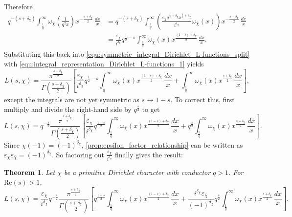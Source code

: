 \documentclass[12pt]{book}
\newtheorem{theorem}{Theorem}[section]
\theoremstyle{definition}\newframedtheorem{method}{Method}
\renewcommand{\d}{\delta}
\newcommand{\w}{\omega}
\newcommand{\G}{\Gamma}
\newcommand{\e}{\varepsilon}
\newcommand{\<}{\langle}
\renewcommand{\>}{\rangle}
\newcommand{\conj}{\overline}
\newcommand{\cchi}{\conj{\chi}}
\renewcommand{\Re}{\mathrm{Re}}
\begin{document}
      Therefore
      \begin{align*}
        q^{-(s+\d_{\chi})}\int_{\frac{1}{q}}^{\infty}\w_{\chi}\left(\frac{1}{q^{2}x}\right)x^{-\frac{s+\d_{\chi}}{2}}\,\frac{dx}{x} &= q^{-(s+\d_{\chi})}\int_{\frac{1}{q}}^{\infty}\left(\frac{\e_{\chi}q^{\frac{1}{2}+\d_{\chi}}x^{\frac{1}{2}+\d_{\chi}}}{i^{\d_{\chi}}}\w_{\cchi}(x)\right)x^{-\frac{s+\d_{\chi}}{2}}\,\frac{dx}{x} \\
        &= \frac{\e_{\chi}}{i^{\d_{\chi}}}q^{\frac{1}{2}-s}\int_{\frac{1}{q}}^{\infty}\w_{\cchi}(x)x^{\frac{(1-s)+\d_{\chi}}{2}}\,\frac{dx}{x}.
      \end{align*}
      Substituting this back into \cref{equ:symmetric_integral_Dirichlet_L-functions_split} with \cref{equ:integral_representation_Dirichlet_L-functions_1} yields
      \[
        L(s,\chi) = \frac{\pi^{\frac{s+\d_{\chi}}{2}}}{\G\left(\frac{s+\d_{\chi}}{2}\right)}\left[\frac{\e_{\chi}}{i^{\d_{\chi}}}q^{\frac{1}{2}-s}\int_{\frac{1}{q}}^{\infty}\w_{\cchi}(x)x^{\frac{(1-s)+\d_{\chi}}{2}}\,\frac{dx}{x}+\int_{\frac{1}{q}}^{\infty}\w_{\chi}(x)x^{\frac{s+\d_{\chi}}{2}}\,\frac{dx}{x}\right],
      \]
      except the integrals are not yet symmetric as $s \to 1-s$. To correct this, first multiply and divide the right-hand side by $q^{\frac{s}{2}}$ to get
      \[
        L(s,\chi) = q^{-\frac{s}{2}}\frac{\pi^{\frac{s+\d_{\chi}}{2}}}{\G\left(\frac{s+\d_{\chi}}{2}\right)}\left[\frac{\e_{\chi}}{i^{\d_{\chi}}}q^{\frac{1-s}{2}}\int_{\frac{1}{q}}^{\infty}\w_{\cchi}(x)x^{\frac{(1-s)+\d_{\chi}}{2}}\,\frac{dx}{x}+q^{\frac{s}{2}}\int_{\frac{1}{q}}^{\infty}\w_{\chi}(x)x^{\frac{s+\d_{\chi}}{2}}\,\frac{dx}{x}\right].
      \]
      Since $\chi(-1) = (-1)^{\d_{\chi}}$, \cref{prop:epsilon_factor_relationship} can be written as $\e_{\chi}\e_{\cchi} = (-1)^{\d_{\chi}}$. So factoring out $\frac{\e_{\chi}}{i^{\d_{\chi}}}$ finally gives the result:

      \begin{theorem}
        Let $\chi$ be a primitive Dirichlet character with conductor $q > 1$. For $\Re(s) > 1$,
        \[
          L(s,\chi) = \frac{\e_{\chi}}{i^{\d_{\chi}}}q^{-\frac{s}{2}}\frac{\pi^{\frac{s+\d_{\chi}}{2}}}{\G\left(\frac{s+\d_{\chi}}{2}\right)}\left[q^{\frac{1-s}{2}}\int_{\frac{1}{q}}^{\infty}\w_{\cchi}(x)x^{\frac{(1-s)+\d_{\chi}}{2}}\,\frac{dx}{x}+\frac{i^{\d_{\chi}}\e_{\cchi}}{(-1)^{\d_{\chi}}}q^{\frac{s}{2}}\int_{\frac{1}{q}}^{\infty}\w_{\chi}(x)x^{\frac{s+\d_{\chi}}{2}}\,\frac{dx}{x}\right].
        \]
      \end{theorem}
\end{document}
